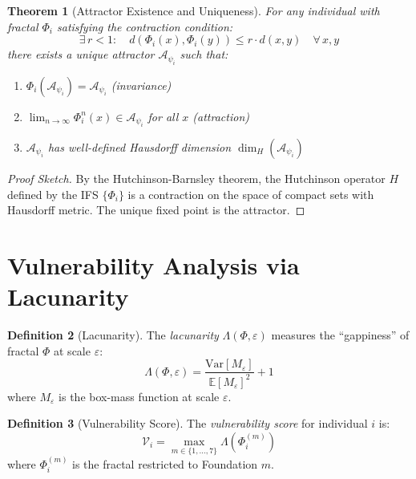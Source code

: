 \documentclass[11pt,twoside]{book}
\theoremstyle{definition}
\newtheorem{definition}{Definition}[chapter]
\theoremstyle{plain}
\newtheorem{theorem}[definition]{Theorem}
\theoremstyle{remark}
\newcommand{\Frac}{\Phi}
\newcommand{\PsychAttractor}{\mathcal{A}_\psi}
\newcommand{\HausdorffDim}{\dim_H}
\newcommand{\Lacunarity}{\Lambda}
\newcommand{\VulnScore}{\mathcal{V}}
\begin{document}
\begin{theorem}[Attractor Existence and Uniqueness]
\label{thm:psych-attractor-unique}
For any individual with fractal $\Frac_i$ satisfying the contraction condition:
\[
    \exists\, r < 1 : \quad d(\Frac_i(x), \Frac_i(y)) \leq r \cdot d(x, y) \quad \forall\, x, y
\]
there exists a unique attractor $\PsychAttractor_i$ such that:
\begin{enumerate}[label=(\roman*)]
    \item $\Frac_i(\PsychAttractor_i) = \PsychAttractor_i$ (invariance)
    \item $\lim_{n \to \infty} \Frac_i^n(x) \in \PsychAttractor_i$ for all $x$ (attraction)
    \item $\PsychAttractor_i$ has well-defined Hausdorff dimension $\HausdorffDim(\PsychAttractor_i)$
\end{enumerate}
\end{theorem}

\begin{proof}[Proof Sketch]
By the Hutchinson-Barnsley theorem, the Hutchinson operator $H$ defined by the IFS $\{\Frac_i\}$ is a contraction on the space of compact sets with Hausdorff metric. The unique fixed point is the attractor.
\end{proof}

\section{Vulnerability Analysis via Lacunarity}

\begin{definition}[Lacunarity]
\label{def:lacunarity-psych}
The \emph{lacunarity} $\Lacunarity(\Frac, \varepsilon)$ measures the ``gappiness'' of fractal $\Frac$ at scale $\varepsilon$:
\[
    \Lacunarity(\Frac, \varepsilon) = \frac{\mathrm{Var}[M_\varepsilon]}{\mathbb{E}[M_\varepsilon]^2} + 1
\]
where $M_\varepsilon$ is the box-mass function at scale $\varepsilon$.
\end{definition}

\begin{definition}[Vulnerability Score]
\label{def:vuln-score-psych}
The \emph{vulnerability score} for individual $i$ is:
\[
    \VulnScore_i = \max_{m \in \{1,\ldots,7\}} \Lacunarity(\Frac_i^{(m)})
\]
where $\Frac_i^{(m)}$ is the fractal restricted to Foundation $m$.
\end{definition}
\end{document}

